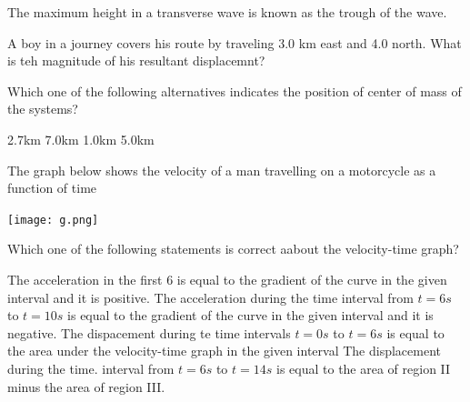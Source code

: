 \documentclass[12pt,addpoints]{exam}
\begin{document}
\begin{questions}
\begin{choices}
			\choice The maximum height in a transverse wave is known as the trough of the wave.
		\end{choices}
		\question A boy in a journey covers his route by traveling 3.0 km east and 4.0 north. What is teh magnitude of his resultant displacemnt?
		\begin{center}
		\end{center} 
		Which one of the following alternatives indicates the position of center of mass of the systems? \\
		\begin{oneparchoices}
			\choice 2.7km
			\choice 7.0km
			\choice 1.0km
			\choice 5.0km
		\end{oneparchoices}
		\question The graph below shows the velocity of a man travelling on a motorcycle as a function of time
		\begin{center}
			\texttt{[image: g.png]}
		\end{center}
		Which one of the following statements is correct aabout the velocity-time graph? \\
		\begin{choices}
			\choice The acceleration in the first 6 is equal to the gradient of the curve in the given interval and it is positive.
			\choice The acceleration during the time interval from $t=6s$ to $t=10s$ is equal to the gradient of the curve in the given interval and it is negative.
			\choice The dispacement during te time intervals $t=0s$ to $t=6s$ is equal to the area under the velocity-time graph in the given interval
			\choice The displacement during the time. interval from $t=6s$ to $t=14s$ is equal to the area of region II minus the area of region III.
		\end{choices}
	\end{questions}
\end{document}
